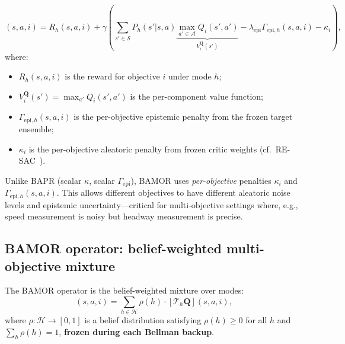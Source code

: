 \begin{definition}
\label{def:t_mode_mo}
\begin{equation}
    [\mathcal{T}_h \mathbf{Q}](s,a,i) = R_h(s,a,i) + \gamma \left( \sum_{s' \in \mathcal{S}} P_h(s'|s,a) \underbrace{\max_{a' \in \mathcal{A}} Q_i(s',a')}_{V_i^{\mathbf{Q}}(s')} - \lambda_{\mathrm{epi}} \Gamma_{\mathrm{epi},h}(s,a,i) - \kappa_i \right),
    \label{eq:mode_operator}
\end{equation}
where:
\begin{itemize}
    \item $R_h(s,a,i)$ is the reward for objective $i$ under mode $h$;
    \item $V_i^{\mathbf{Q}}(s') = \max_{a'} Q_i(s',a')$ is the per-component value function;
    \item $\Gamma_{\mathrm{epi},h}(s,a,i)$ is the per-objective epistemic penalty from the frozen target ensemble;
    \item $\kappa_i$ is the per-objective aleatoric penalty from frozen critic weights (cf.\ RE-SAC~\cite{Zhang2025RESAC}).
\end{itemize}
\end{definition}

\begin{remark}
Unlike BAPR (scalar $\kappa$, scalar $\Gamma_{\mathrm{epi}}$), BAMOR uses \emph{per-objective} penalties $\kappa_i$ and $\Gamma_{\mathrm{epi},h}(s,a,i)$.  This allows different objectives to have different aleatoric noise levels and epistemic uncertainty---critical for multi-objective settings where, e.g., speed measurement is noisy but headway measurement is precise.
\end{remark}

\subsection{BAMOR operator: belief-weighted multi-objective mixture}

\begin{definition}
\label{def:t_bamor}
The BAMOR operator is the belief-weighted mixture over modes:
\begin{equation}
    [\mathcal{T}^{\mathrm{BAMOR}}_\rho \mathbf{Q}](s,a,i) = \sum_{h \in \mathcal{H}} \rho(h) \cdot [\mathcal{T}_h \mathbf{Q}](s,a,i),
    \label{eq:bamor_operator}
\end{equation}
where $\rho : \mathcal{H} \to [0,1]$ is a belief distribution satisfying $\rho(h) \ge 0$ for all $h$ and $\sum_h \rho(h) = 1$, \textbf{frozen during each Bellman backup}.
\end{definition}

